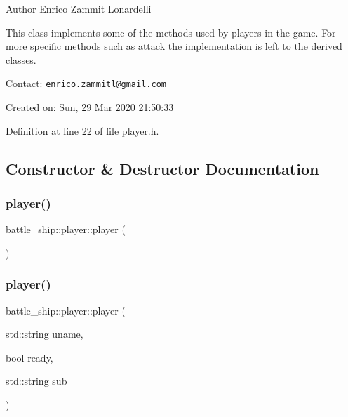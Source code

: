 \begin{DoxyAuthor}{Author}
Enrico Zammit Lonardelli
\end{DoxyAuthor}
This class implements some of the methods used by players in the game. For more specific methods such as attack the implementation is left to the derived classes.

Contact\+: \href{mailto:enrico.zammitl@gmail.com}{\tt enrico.\+zammitl@gmail.\+com}

Created on\+: Sun, 29 Mar 2020 21\+:50\+:33 

Definition at line 22 of file player.\+h.



\subsection{Constructor \& Destructor Documentation}
\mbox{\label{classbattle__ship_1_1player_a54df3c03653a24049b9629ce5c55fafa}} 
\subsubsection{\texorpdfstring{player()}{player()}\hspace{0.1cm}{\footnotesize\ttfamily [1/2]}}
{\footnotesize\ttfamily battle\+\_\+ship\+::player\+::player (\begin{DoxyParamCaption}{ }\end{DoxyParamCaption})\hspace{0.3cm}{\ttfamily [default]}}

\mbox{\label{classbattle__ship_1_1player_a9c5da318ece63c6bdd3825cfa6ea9b4f}} 
\subsubsection{\texorpdfstring{player()}{player()}\hspace{0.1cm}{\footnotesize\ttfamily [2/2]}}
{\footnotesize\ttfamily battle\+\_\+ship\+::player\+::player (\begin{DoxyParamCaption}\item[{std\+::string}]{uname,  }\item[{bool}]{ready,  }\item[{std\+::string}]{sub }\end{DoxyParamCaption})\hspace{0.3cm}{\ttfamily [inline]}}




